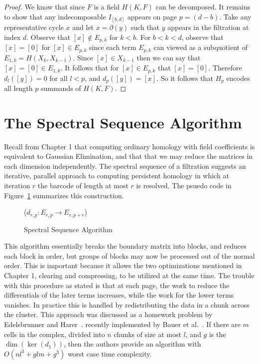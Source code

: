 \begin{proof}
We know that since $F$ is a field $H(K,F)$ can be decomposed. It remains to show that any indecomposable $I_{[b,d]}$ appears on page $p = (d-b)$. Take any representative cycle $x$ and let $x = \partial(y)$ such that $y$ appears in the filtration at index $d$. Observe that $[x] \notin E_{p,k}$ for $k < b$. For $b < k < d$, observe that $[x]  = [0]$ for $[x] \in E_{p,k}$  since each term $E_{p,k}$ can viewed as a subquotient of $E_{1,k} = H(X_k, X_{k-1})$. Since $[x] \in X_{k-1}$ then we can say that $[x] = [0] \in E_{1,k} $. It follows that for $[x] \in E_{p,k}$ that $[x] = [0]$. Therefore $d_l([y]) = 0$ for all $l < p$, and $d_p([y])=[x]$. So it follows that $H_p$ encodes all length $p$ summands of $H(K,F)$.
\end{proof}
\section{The Spectral Sequence Algorithm}
\label{sec:persistence-algorithm}
Recall from Chapter 1 that computing ordinary homology with field coefficients is equivalent to Gaussian Elimination, and that that we may reduce the matrices in each dimension independently. The spectral sequence of a filtration suggests an iterative, parallel approach to computing persistent homology in which at iteration $r$ the barcode of length at most $r$ is resolved. The  psuedo code in Figure~\ref{alg:ss-alg} summarizes this construction.
\begin{figure}
\begin{codebox}
\li {}  
\li \Do
\li {} 
\li \Do
\li  {}($d_{r,p} : E_{r,p} \rightarrow E_{r,p+r}$)
\End
\End
\end{codebox}
\caption{Spectral Sequence Algorithm}
\label{alg:ss-alg}
\end{figure}
This algorithm essentially breaks the boundary matrix into blocks, and reduces each block in order, but groups of blocks may now be processed out of the normal order. This is important
because it allows the two optimizations mentioned in Chapter 1, clearing and compressing, to be utilized at the same time. The trouble with this procedure as stated is that at each page, the work to reduce the differentials of the later terms increases, while the work for the lower terms vanishes. In practice this is handled by redistributing the data in a chunk across the cluster.  This approach was discussed as a homework problem by Edelsbrunner and Harer~\cite{edelsbrunner2010computational}. recently implemented by Bauer et al.~\cite{bkr-cccph-13}. If there are $m$ cells in the complex, divided into $n$ chunks of size at most $l$, and $g$ is the $\dim(\ker(d_1))$, then the authors provide an algorithm with  $O(nl^3 + glm + g^3)$ worst case time complexity. 

